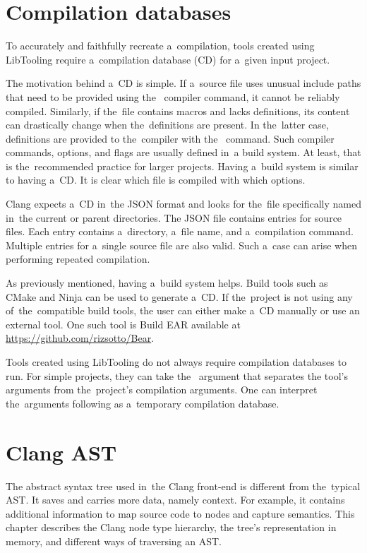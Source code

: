 \section{Compilation databases}

To accurately and faithfully recreate a~compilation, tools created using 
LibTooling require a~compilation database (CD) \citep{cd:online} 
for a~given input project.

The motivation behind a~CD is simple.
If a~source file uses unusual include paths that need to be provided 
using the~ compiler command, it cannot be reliably compiled.
Similarly, if the~file contains macros and lacks definitions, its content 
can drastically change when the~definitions are present.
In the~latter case, definitions are provided to the~compiler 
with the~ command.
Such compiler commands, options, and flags are usually defined in~a build 
system.
At least, that is the~recommended practice for larger projects.
Having a~build system is similar to having a~CD.
It is clear which file is compiled with which options.

Clang expects a~CD in~the JSON format and looks for the~file specifically
named   in~the current or parent 
directories.
The JSON file contains entries for source files.
Each entry contains a~directory, a~file name, and a~compilation command.
Multiple entries for a~single source file are also valid.
Such a~case can arise when performing repeated compilation.

As previously mentioned, having a~build system helps.
Build tools such as CMake and Ninja can be used to generate a~CD.
If the~project is not using any of~the~compatible build tools, 
the user can either make a~CD manually or use an external tool.
One such tool is Build EAR available at \url{https://github.com/rizsotto/Bear}.

Tools created using LibTooling do not always require compilation databases 
to run.
For simple projects, they can take the~\icode{-{}-} argument that separates 
the tool's arguments from the~project's compilation arguments.
One can interpret the~arguments following \icode{-{}-} as a~temporary
compilation database.

\section{Clang AST}\label{chap:ast}

The abstract syntax tree used in~the Clang front-end \citep{ast:online}
is different from the~typical AST. 
It saves and carries more data, namely context.  
For example, it contains additional information to map source 
code to nodes and capture semantics. 
This chapter describes the Clang node type hierarchy, the tree's 
representation in memory, and different ways of traversing an AST.
